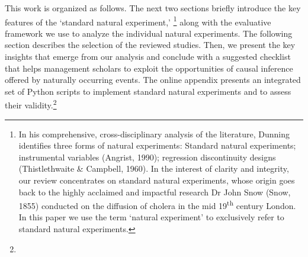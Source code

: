 


This work is organized as follows. The next two sections briefly introduce the
key features of the `standard natural experiment,' \footnote{In his
comprehensive, cross-disciplinary analysis of the literature, Dunning
\citeyear[][]{Dunning2012} identifies three forms of natural experiments:
Standard natural experiments; instrumental variables (Angrist, 1990); regression
discontinuity designs (Thistlethwaite \& Campbell, 1960). In the interest of
clarity and integrity, our review concentrates on standard natural experiments,
whose origin goes back to the highly acclaimed and impactful research Dr John
Snow (Snow, 1855) conducted on the diffusion of cholera in the mid
19\textsuperscript{th} century London. In this paper we use the term `natural
experiment' to exclusively refer to standard natural experiments.} along with
the evaluative framework we use to analyze the individual natural experiments.
The following section describes the selection of the reviewed studies. Then, we
present the key insights that emerge from our analysis and conclude with a
suggested checklist that helps management scholars to exploit the opportunities
of causal inference offered by naturally occurring events. The online appendix
presents an integrated set of Python scripts to implement standard natural
experiments and to assess their validity.\footnote{}

